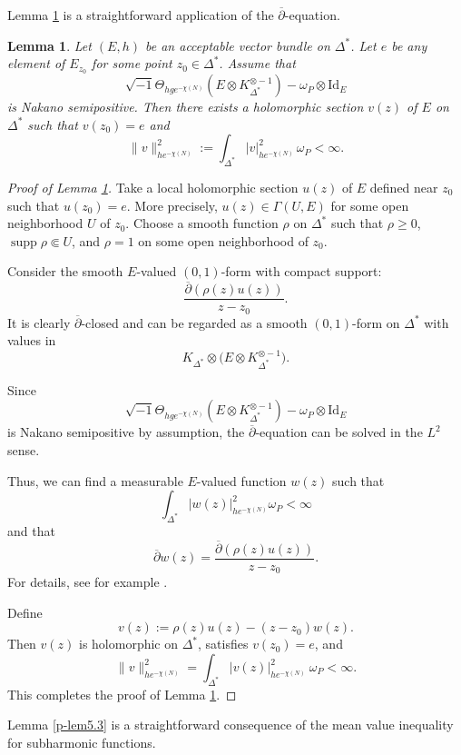 \documentclass[12pt,twoside]{amsart}
\DeclareMathOperator{\supp}{supp}
\newtheorem{lem}[thm]{Lemma}
\theoremstyle{definition}
\begin{document}
Lemma \ref{p-lem5.2} is a straightforward application of the $\overline{\partial}$-equation.

\begin{lem}\label{p-lem5.2}
Let $(E, h)$ be an acceptable vector bundle on $\Delta^*$.  
Let $e$ be any element of $E_{z_0}$ for some point $z_0 \in \Delta^*$.  
Assume that
\[
\sqrt{-1} \Theta_{h g e^{-\chi(N)}}(E \otimes K_{\Delta^*}^{\otimes -1})
- \omega_P \otimes \mathrm{Id}_E
\]
is Nakano semipositive.  
Then there exists a holomorphic section 
$v(z)$ of $E$ on $\Delta^*$ such that $v(z_0) = e$ and
\[
\|v\|^2_{h e^{-\chi(N)}} := \int_{\Delta^*} |v|^2_{h e^{-\chi(N)}} \, \omega_P < \infty.
\]
\end{lem}

\begin{proof}[Proof of Lemma \ref{p-lem5.2}]
Take a local holomorphic section $u(z)$ of $E$ defined near $z_0$ 
such that $u(z_0) = e$. 
More precisely, 
$u(z) \in \Gamma(U, E)$ for some open neighborhood $U$ of $z_0$.  
Choose a smooth function $\rho$ 
on $\Delta^*$ such that $\rho \geq 0$, 
$\supp \rho \Subset U$, and $\rho = 1$ on some open neighborhood of $z_0$.

Consider the smooth $E$-valued $(0,1)$-form with compact support:
\[
\frac{\overline{\partial}(\rho(z) u(z))}{z - z_0}.
\] 
It is clearly $\overline{\partial}$-closed and can be regarded as a smooth $(0,1)$-form on $\Delta^*$ with values in  
\[
K_{\Delta^*} \otimes \bigl(E \otimes K_{\Delta^*}^{\otimes -1}\bigr).
\] 

Since 
\[
\sqrt{-1} \Theta_{h g e^{-\chi(N)}}(E \otimes K_{\Delta^*}^{\otimes -1}) 
- \omega_P \otimes \mathrm{Id}_E
\]
is Nakano semipositive by assumption, 
the $\overline{\partial}$-equation can be solved in the $L^2$ sense.

Thus, we can find a measurable $E$-valued function $w(z)$ such that
\[
\int_{\Delta^*} |w(z)|^2_{h e^{-\chi(N)}}  \omega_P < \infty
\] 
and that 
\[
\overline{\partial} w(z) = \frac{\overline{\partial}(\rho(z) u(z))}{z - z_0}.
\]
For details, see for example \cite[Chapter VIII, (6.1) Theorem]{demailly}.

Define
\[
v(z) := \rho(z) u(z) - (z - z_0) w(z).
\]
Then $v(z)$ is holomorphic on $\Delta^*$, satisfies $v(z_0) = e$, and
\[
\|v\|^2_{h e^{-\chi(N)}} = \int_{\Delta^*} 
|v(z)|^2_{h e^{-\chi(N)}} \ \omega_P < \infty.
\]
This completes the proof of Lemma \ref{p-lem5.2}.
\end{proof}

Lemma \ref{p-lem5.3} is a straightforward consequence of the mean value inequality 
for subharmonic functions.
\end{document}
